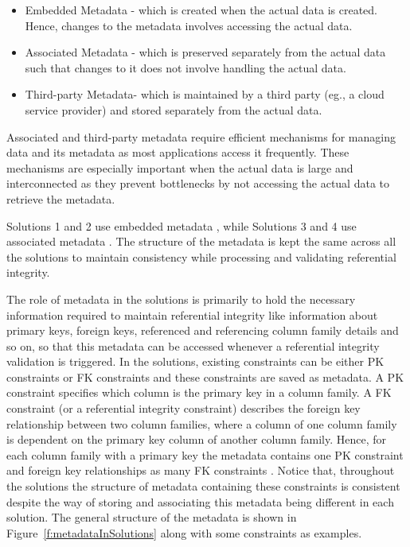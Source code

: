 \begin{itemize}
  \item Embedded Metadata - which is created when the actual data is
  created.  Hence, changes to the metadata involves accessing the actual data.
  
  \item Associated Metadata - which is preserved separately from
  the actual data such that changes to it does not involve handling the
  actual data. 
  \item Third-party Metadata- which is maintained by a third
  party (eg., a cloud service provider) and stored separately 
  from the actual data. 
\end{itemize}
Associated  and third-party metadata require efficient mechanisms for
managing  data and its metadata as most
applications access it  frequently. These mechanisms are especially important  
when the actual data is large and interconnected as they prevent bottlenecks by
not accessing  the actual data to retrieve the metadata. 

 Solutions 1 and 2  use embedded metadata , while Solutions 3 and 4 use associated
metadata .
The structure of the metadata is kept the same across all the solutions to
maintain consistency while processing  and  validating  referential
integrity.

The role of metadata in  the solutions is primarily to hold the necessary
 information required to maintain referential integrity like information about
 primary keys,  foreign keys,  referenced and referencing column family details
 and so on, so that this metadata can be accessed whenever a referential
 integrity validation is triggered.  
In the solutions,  existing constraints can be either \ac{PK} constraints
or \ac{FK} constraints and these constraints are saved as metadata.  A \ac{PK}
constraint specifies which column is the primary key in a column family.  A
\ac{FK} constraint (or a referential integrity constraint) describes the foreign
key relationship between two column families, where a column of one column
family is dependent on the primary key column of another column family.  Hence,
for each column family with a primary key  the
metadata  contains one \ac{PK} constraint  and foreign key relationships as
many
 \ac{FK}
constraints . Notice that, throughout the solutions 
 the structure of metadata containing these constraints is consistent despite
 the way of storing and associating this metadata being different
in each solution.  The general structure of the metadata is shown in
Figure~\ref{f:metadataInSolutions} along with some constraints as examples. \\

